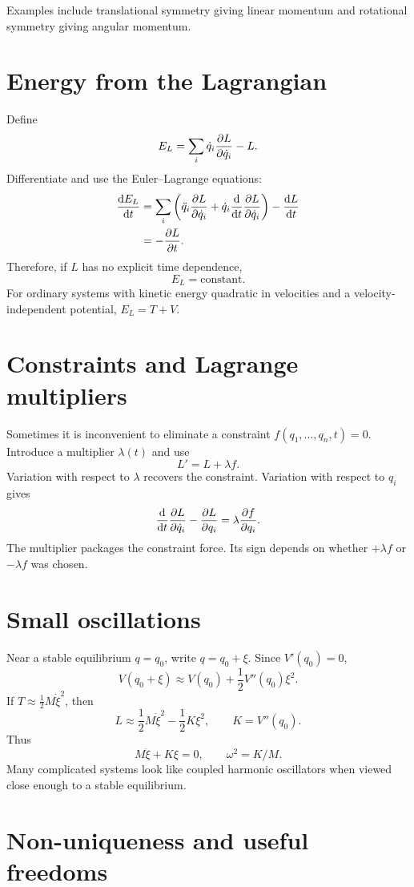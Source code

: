 \documentclass[11pt,a4paper]{article}
\begin{document}
Examples include translational symmetry giving linear momentum and rotational symmetry giving angular momentum.

\section{Energy from the Lagrangian}

Define
\[
E_L=\sum_i\dot q_i\frac{\partial L}{\partial \dot q_i}-L.
\]
Differentiate and use the Euler--Lagrange equations:
\begin{align*}
\frac{\mathop{}\!\mathrm d E_L}{\mathop{}\!\mathrm d t}
&=\sum_i\left(
\ddot q_i\frac{\partial L}{\partial \dot q_i}
+\dot q_i\frac{\mathop{}\!\mathrm d }{\mathop{}\!\mathrm d t}\frac{\partial L}{\partial \dot q_i}
\right)-\frac{\mathop{}\!\mathrm d L}{\mathop{}\!\mathrm d t}\\
&=-\frac{\partial L}{\partial t}.
\end{align*}
Therefore, if $L$ has no explicit time dependence,
\[
\boxed{E_L=\text{constant}.}
\]
For ordinary systems with kinetic energy quadratic in velocities and a velocity-independent potential, $E_L=T+V$.

\section{Constraints and Lagrange multipliers}

Sometimes it is inconvenient to eliminate a constraint $f(q_1,\ldots,q_n,t)=0$. Introduce a multiplier $\lambda(t)$ and use
\[
L'=L+\lambda f.
\]
Variation with respect to $\lambda$ recovers the constraint. Variation with respect to $q_i$ gives
\[
\frac{\mathop{}\!\mathrm d }{\mathop{}\!\mathrm d t}\frac{\partial L}{\partial \dot q_i}-\frac{\partial L}{\partial q_i}=\lambda\frac{\partial f}{\partial q_i}.
\]
The multiplier packages the constraint force. Its sign depends on whether $+\lambda f$ or $-\lambda f$ was chosen.

\section{Small oscillations}

Near a stable equilibrium $q=q_0$, write $q=q_0+\xi$. Since $V'(q_0)=0$,
\[
V(q_0+\xi)\approx V(q_0)+\frac12V''(q_0)\xi^2.
\]
If $T\approx\tfrac12M\dot\xi^2$, then
\[
L\approx\frac12M\dot\xi^2-\frac12K\xi^2,
\qquad K=V''(q_0).
\]
Thus
\[
M\ddot\xi+K\xi=0,
\qquad
\omega^2=K/M.
\]
Many complicated systems look like coupled harmonic oscillators when viewed close enough to a stable equilibrium.

\section{Non-uniqueness and useful freedoms}
\end{document}
